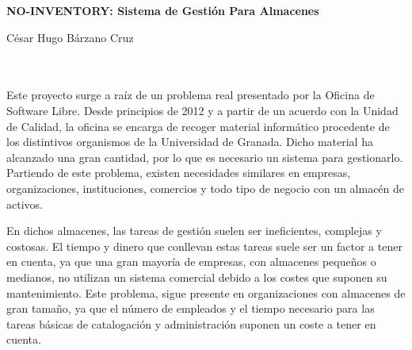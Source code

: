 

%



\cleardoublepage
\thispagestyle{empty}

\begin{center}
{\large\bfseries NO-INVENTORY: Sistema de Gestión Para Almacenes}\\
\end{center}
\begin{center}
César Hugo Bárzano Cruz\\
\end{center}

\\

\vspace{0.7cm}
\\

Este proyecto surge a raíz de un problema real presentado por la Oficina de Software Libre. Desde principios de 2012 y a partir de un acuerdo con la Unidad de Calidad, la oficina se encarga de recoger material informático procedente de los distintivos organismos de la Universidad de Granada. Dicho material ha alcanzado una gran cantidad, por lo que es necesario un sistema para gestionarlo. 
Partiendo de este problema, existen necesidades similares en empresas, organizaciones, instituciones, comercios y todo tipo de negocio con un almacén de activos.

En dichos almacenes, las tareas de gestión suelen ser ineficientes, complejas y costosas.  El tiempo y dinero que conllevan estas tareas suele ser un factor a tener en cuenta, ya que una gran mayoría de empresas, con almacenes pequeños o medianos, no utilizan un sistema comercial debido a los costes que suponen su mantenimiento. Este problema, sigue presente en organizaciones con almacenes de gran tamaño, ya que  el número de empleados y el tiempo necesario para las tareas básicas de catalogación y administración suponen un coste a tener en cuenta.


